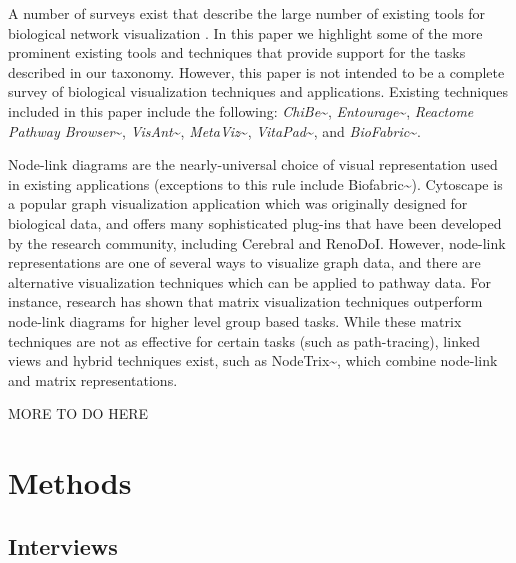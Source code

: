 A number of surveys exist that describe the large number of existing
tools for biological network visualization
\cite{Suderman2007tools,pavlopoulos2008survey,Gehlenborg2010omics}. In
this paper we highlight some of the more prominent existing tools and
techniques that provide support for the tasks described in our taxonomy.
However, this paper is not intended to be a complete survey of
biological visualization techniques and applications. Existing
techniques included in this paper include the following:
\textit{ChiBe}\textasciitilde{}\cite{Babur2010chibe},
\textit{Entourage}\textasciitilde{}\cite{Lex2013entourage},
\textit{Reactome Pathway Browser}\textasciitilde{}\cite{croft2014reactome},
\textit{VisAnt}\textasciitilde{}\cite{hu2004visant},
\textit{MetaViz}\textasciitilde{}\cite{bourqui2007metabolic},
\textit{VitaPad}\textasciitilde{}\cite{holford2005vitapad}, and
\textit{BioFabric}\textasciitilde{}\cite{Longabaugh2012biofabric}.

Node-link diagrams are the nearly-universal choice of visual
representation used in existing applications (exceptions to this rule
include Biofabric\textasciitilde{}\cite{Longabaugh2012biofabric}).
Cytoscape \cite{cytoscape} is a popular graph visualization application
which was originally designed for biological data, and offers many
sophisticated plug-ins that have been developed by the research
community, including Cerebral\cite{Barsky2008cerebral} and
RenoDoI\cite{Vehlow2015}. However, node-link representations are one of
several ways to visualize graph data, and there are alternative
visualization techniques which can be applied to pathway data. For
instance, research has shown that matrix visualization techniques
outperform node-link diagrams for higher level group based
tasks\cite{Ghoniem2004,Henry2007}. While these matrix techniques are not
as effective for certain tasks (such as path-tracing), linked views and
hybrid techniques exist, such as
NodeTrix\textasciitilde{}\cite{NodeTrix2007}, which combine node-link
and matrix representations.

MORE TO DO HERE

\section*{Methods}

\subsection*{Interviews}


